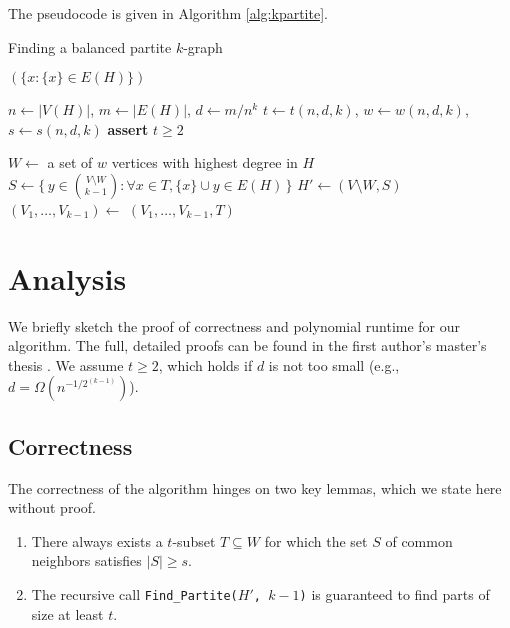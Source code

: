 \documentclass[11pt,a4paper]{article}
\theoremstyle{definition}
\begin{document}
The pseudocode is given in Algorithm \ref{alg:kpartite}.

\begin{algorithm}[H]
    \caption{Finding a balanced partite $k$-graph}
    \label{alg:kpartite}
    \begin{algorithmic}[1]
                \State \Return $(\{x \colon \{x\} \in E(H)\})$
            \EndIf

            \State $n \gets |V(H)|$, $m \gets |E(H)|$, $d \gets m/n^k$
            \State $t \gets t(n, d, k)$, $w \gets w(n, d, k)$, $s \gets s(n, d, k)$
            \State \textbf{assert} $t \ge 2$

            \State $W \gets$ a set of $w$ vertices with highest degree in $H$
                \State $S \gets \{\,y \in \binom{V\setminus W}{k-1} \colon \forall x \in T, \{x\} \cup y \in E(H)\,\}$
                    \State $H' \gets (V \setminus W, S)$  
                    \State $(V_1, \dots, V_{k-1}) \gets$ 
                    \State \Return $(V_1, \dots, V_{k-1}, T)$
                \EndIf
            \EndFor
        \EndFunction
    \end{algorithmic}
\end{algorithm}

\section{Analysis}

We briefly sketch the proof of correctness and polynomial runtime for our algorithm. The full, detailed proofs can be found in the first author's master's thesis \cite{Espuna2025}. We assume $t \ge 2$, which holds if $d$ is not too small (e.g., $d = \Omega(n^{-1/2^{(k-1)}})$).

\subsection{Correctness}

The correctness of the algorithm hinges on two key lemmas, which we state here without proof.
\begin{enumerate}
    \item There always exists a $t$-subset $T \subseteq W$ for which the set $S$ of common neighbors satisfies $|S| \ge s$.
    \item The recursive call \texttt{Find\_Partite($H'$, $k-1$)} is guaranteed to find parts of size at least $t$.
\end{enumerate}
\end{document}
